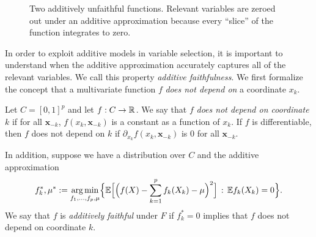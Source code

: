 \begin{figure}[htp]
\vskip-10pt
	\centering
\caption{Two additively unfaithful functions. Relevant variables are
  zeroed out under an additive approximation because every ``slice''
  of the function integrates to zero.}
\vskip-10pt
\end{figure}

In order to exploit additive models in variable selection, it is important to understand when the
additive approximation accurately captures all of the relevant variables.
We call this property \textit{additive faithfulness}. We first formalize the concept that a multivariate function $f$ \emph{does not depend on} a coordinate $x_k$.

\begin{definition}
Let $C = [0,1]^p$ and let $f: C \rightarrow {\mathbb R}$. We say that $f$ \textit{does not depend on coordinate $k$} if for all $\mathbf{x}_{-k}$, $f(x_k, \mathbf{x}_{-k})$ is a constant as a function of $x_k$. If $f$ is differentiable, then $f$ does not depend on $k$ if $\partial_{x_k} f(x_k, \mathbf{x}_{-k})$ is 0 for all $\mathbf{x}_{-k}$.

In addition, suppose we have a distribution over $C$ and the additive approximation
\begin{equation}
\label{eqn:unconstrained_additive}
f_k^*, \mu^* := \mathop{\text{\rm arg\,min}}_{f_1,\ldots, f_p, \mu} \Bigl\{ 
             {\mathbb E} \Bigl[\Bigl( f(X) - \sum_{k=1}^p f_k(X_k) -\mu \Bigr)^2 \Bigr]
         \,:\, {\mathbb E} f_k(X_k) = 0 \Bigr\}.
\end{equation}
We say that $f$ is \textit{additively faithful} under $F$ if
$f^*_k = 0$ implies that $f$ does not depend on coordinate $k$.
\end{definition}

